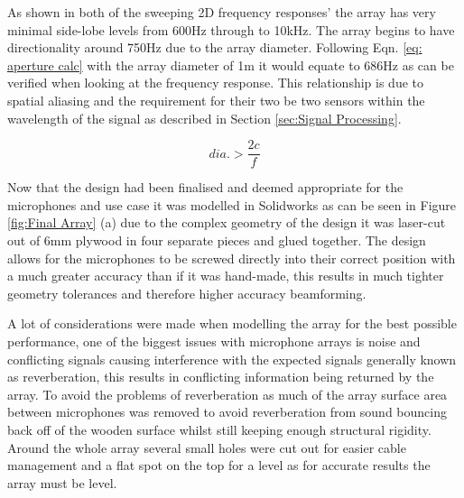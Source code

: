 \documentclass{UoNMCHA}
\numberwithin{equation}{section}
\begin{document}
        As shown in both of the sweeping 2D frequency responses' the array has very minimal side-lobe levels from 600Hz through to 10kHz. The array begins to have directionality around 750Hz due to the array diameter. Following Eqn. \ref{eq: aperture calc} with the array diameter of 1m it would equate to 686Hz as can be verified when looking at the frequency response. This relationship is due to spatial aliasing and the requirement for their two be two sensors within the wavelength of the signal as described in Section \ref{sec:Signal Processing}.
        
        \begin{equation}
            dia. > \frac{2c}{f}
            \label{eq: aperture calc}
        \end{equation}
        
        
        Now that the design had been finalised and deemed appropriate for the microphones and use case it was modelled in Solidworks as can be seen in Figure \ref{fig:Final Array} (a) due to the complex geometry of the design it was laser-cut out of 6mm plywood in four separate pieces and glued together. The design allows for the microphones to be screwed directly into their correct position with a much greater accuracy than if it was hand-made, this results in much tighter geometry tolerances and therefore higher accuracy beamforming.

        A lot of considerations were made when modelling the array for the best possible performance, one of the biggest issues with microphone arrays is noise and conflicting signals causing interference with the expected signals generally known as reverberation, this results in conflicting information being returned by the array. To avoid the problems of reverberation as much of the array surface area between microphones was removed to avoid reverberation from sound bouncing back off of the wooden surface whilst still keeping enough structural rigidity. Around the whole array several small holes were cut out for easier cable management and a flat spot on the top for a level as for accurate results the array must be level.
\end{document}
